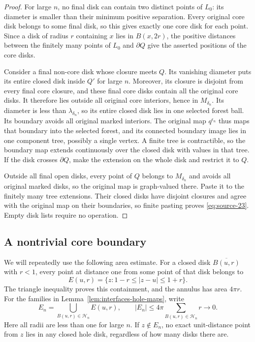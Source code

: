 \begin{proof}
For large $n$, no final disk can contain two distinct points of $L_0$:
its diameter is smaller than their minimum positive separation.
Every original core disk belongs to some final disk, so this gives
exactly one core disk for each point.  Since a disk of radius $r$
containing $x$ lies in $B(x,2r)$, the positive distances between the
finitely many points of $L_0$ and $\partial Q$ give the asserted
positions of the core disks.

Consider a final non-core disk whose closure meets $Q$.  Its vanishing
diameter puts its entire closed disk inside $Q'$ for large $n$.
Moreover, its closure is disjoint from every final core closure,
and these final core disks contain all the original core disks.
It therefore lies outside all original core interiors, hence in
$M_{\delta_n}$.  Its diameter is less than $\lambda_{\delta_n}$,
so its entire closed disk lies in one selected forest ball.
Its boundary avoids all original marked interiors.  The original
map $q^{\epsilon_n}$ thus maps that boundary into the selected
forest, and its connected boundary image lies in one component
tree, possibly a single vertex.  A finite tree is contractible,
so the boundary map extends continuously over the closed disk
with values in that tree.  If the disk crosses $\partial Q$,
make the extension on the whole disk and restrict it to $Q$.

Outside all final open disks, every point of $Q$ belongs to
$M_{\delta_n}$ and avoids all original marked disks, so the original
map is graph-valued there.  Paste it to the finitely many tree
extensions.  Their closed disks have disjoint closures and agree
with the original map on their boundaries, so finite pasting proves
\eqref{eq:source-23}.  Empty disk lists require no operation.
\end{proof}

\subsection{A nontrivial core boundary}

We will repeatedly use the following area estimate.  For a closed
disk $\overline{B(u,r)}$ with $r<1$, every point at distance one from
some point of that disk belongs to
\[
 E(u,r)=\{z:1-r\le |z-u|\le1+r\}.
\]
The triangle inequality proves this containment, and the annulus
has area $4\pi r$.  For the families in
Lemma~\ref{lem:interfaces-hole-maps}, write
\begin{equation}
 E_n=\bigcup_{B(u,r)\in\mathcal H_n}E(u,r),
 \qquad
 |E_n|\le4\pi\sum_{B(u,r)\in\mathcal H_n}r\longrightarrow0.
 \label{eq:interfaces-annulus-area}
\end{equation}
Here all radii are less than one for large $n$.  If $z\notin E_n$,
no exact unit-distance point from $z$ lies in any closed hole disk,
regardless of how many disks there are.

